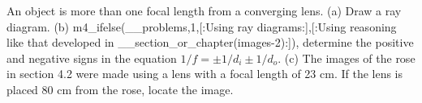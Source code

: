 \answercheck An object is more than one focal length from a
converging lens. (a) Draw a ray diagram. 
(b) m4_ifelse(__problems,1,[:Using ray diagrams:],[:Using reasoning
like that developed in __section_or_chapter(images-2):]), determine the
positive and negative signs in the equation $1/f=\pm1/d_i\pm1/d_o$. (c) The images
of the rose in section 4.2 were made using a lens with a
focal length of 23 cm. If the lens is placed 80 cm from the
rose, locate the image.
